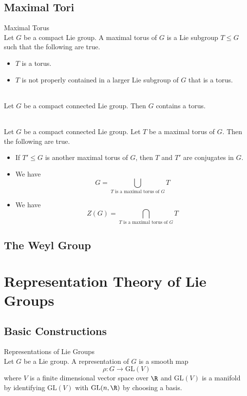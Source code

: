 \documentclass[a4paper]{article}
\begin{document}
\subsection{Maximal Tori}
\begin{defn}{Maximal Torus}{}\\
Let $G$ be a compact Lie group. A maximal torus of $G$ is a Lie subgroup $T\leq G$ such that the following are true. 
\begin{itemize}
\item $T$ is a torus. 
\item $T$ is not properly contained in a larger Lie subgroup of $G$ that is a torus. 
\end{itemize}
\end{defn}

\begin{prp}{}{}\\
Let $G$ be a compact connected Lie group. Then $G$ contains a torus. 
\end{prp}

\begin{prp}{}{}\\
Let $G$ be a compact connected Lie group. Let $T$ be a maximal torus of $G$. Then the following are true. 
\begin{itemize}
\item If $T'\leq G$ is another maximal torus of $G$, then $T$ and $T'$ are conjugates in $G$. 
\item We have $$G=\bigcup_{T\text{ is a maximal torus of }G}T$$
\item We have $$Z(G)=\bigcap_{T\text{ is a maximal torus of }G}T$$
\end{itemize}
\end{prp}

\subsection{The Weyl Group}

\pagebreak
\section{Representation Theory of Lie Groups}
\subsection{Basic Constructions}
\begin{defn}{Representations of Lie Groups}{}\\
Let $G$ be a Lie group. A representation of $G$ is a smooth map $$\rho:G\to\text{GL}(V)$$ where $V$ is a finite dimensional vector space over $\R$ and $\text{GL}(V)$ is a manifold by identifying $\text{GL}(V)$ with $\text{GL}(n,\R)$ by choosing a basis. 
\end{defn}
\end{document}
